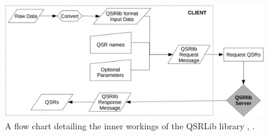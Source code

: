\begin{figure}[h]
	\centering
	\includegraphics[scale=0.7]{images/qsrlib_flow}
	\caption{A flow chart detailing the inner workings of the QSRLib library \cite{qsrlib}, \cite{gatsoulis2016qsrlib}.}
	\label{fig:qsrlibflow}
\end{figure}
 
